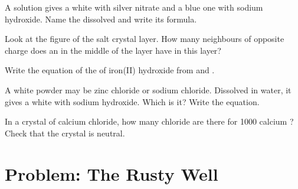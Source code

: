 \begin{exercise}[$\star\star$]\label{exo:g9:ions:8}
A solution gives a white  with silver nitrate and a blue one
with sodium hydroxide. Name the dissolved  and write its
formula.
\end{exercise}

\begin{exercise}[$\star\star$]\label{exo:g9:ions:9}
Look at the figure of the salt crystal layer. How many neighbours of
opposite charge does an  in the middle of the layer have in this
layer?
\end{exercise}

\begin{exercise}[$\star\star$]\label{exo:g9:ions:10}
Write the equation of the  of iron(II) hydroxide from
 and  .
\end{exercise}

\begin{exercise}[$\star\star\star$]\label{exo:g9:ions:11}
A white powder may be zinc chloride or sodium chloride. Dissolved in
water, it gives a white  with sodium hydroxide. Which is it?
Write the equation.
\end{exercise}

\begin{exercise}[$\star\star\star$]\label{exo:g9:ions:12}
In a crystal of calcium chloride, how many chloride  are there for
1000 calcium ? Check that the crystal is neutral.
\end{exercise}

\section{Problem: The Rusty Well}

